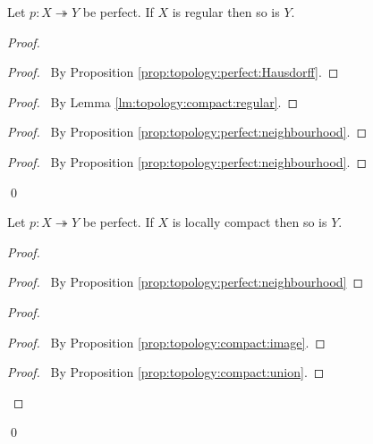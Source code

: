   \begin{prop}
 Let $p : X \twoheadrightarrow Y$ be perfect. If $X$ is regular then so is
$Y$.
\end{prop}

\begin{proof}
 \pf
 \begin{proof}
   \pf\ By Proposition \ref{prop:topology:perfect:Hausdorff}.
 \end{proof}
 \begin{proof}
   \pf\ By Lemma \ref{lm:topology:compact:regular}.
 \end{proof}
 \begin{proof}
   \pf\ By Proposition \ref{prop:topology:perfect:neighbourhood}.
 \end{proof}
 \begin{proof}
   \pf\ By Proposition \ref{prop:topology:perfect:neighbourhood}.
 \end{proof}
 \qed
\end{proof}

  \begin{prop}[AC]
 Let $p : X \twoheadrightarrow Y$ be perfect. If $X$ is locally compact then
 so is $Y$.
\end{prop}

\begin{proof}
 \pf
 \begin{proof}
   \pf\ By Proposition \ref{prop:topology:perfect:neighbourhood}
 \end{proof}
 \begin{proof}
   \begin{proof}
     \pf\ By Proposition \ref{prop:topology:compact:image}.
   \end{proof}
   \qedstep
   \begin{proof}
      \pf\ By Proposition \ref{prop:topology:compact:union}.
    \end{proof}
 \end{proof}
 \qed
\end{proof}

